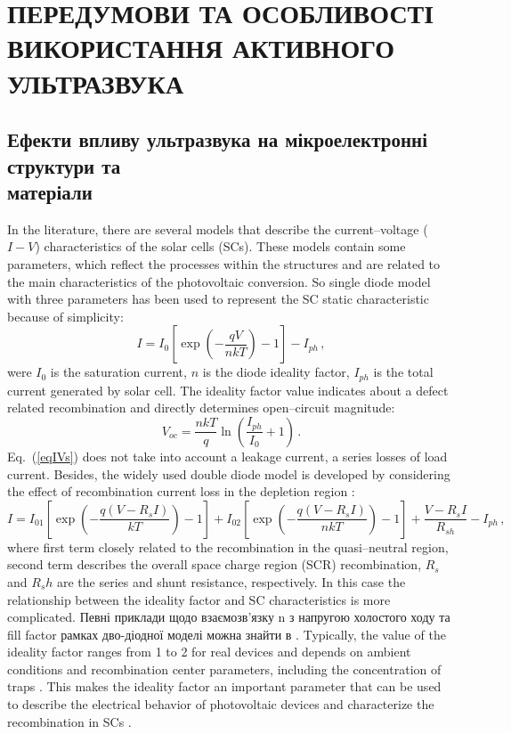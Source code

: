 \chapter{\MakeUppercase{Передумови та особливості використання активного ультразвука}}



\section{Ефекти впливу ультразвука на мікроелектронні структури та \\ матеріали \label{Oglyad}}
In the literature, there are several models that describe the current--voltage ($I-V$) characteristics of the solar cells (SCs).
These models contain some parameters, which reflect the processes within the structures and are related to the main characteristics of the photovoltaic conversion.
So single diode model with three parameters has been used to represent the SC static characteristic because of simplicity:
\begin{equation}
\label{eqIVs}
    I=I_{0}\left[\exp\left(-\frac{qV}{nkT}\right)-1\right]-I_{ph}\,,
\end{equation}
were
$I_0$ is the saturation current,
$n$ is the diode ideality factor,
$I_{ph}$ is the total current generated by solar cell.
The ideality factor value indicates about a defect related recombination and directly determines open--circuit magnitude:
\begin{equation}
\label{eqVoc}
    V_{oc}=\frac{nkT}{q}\ln\left(\frac{I_{ph}}{I_0}+1\right)\,.
\end{equation}
Eq.~(\ref{eqIVs}) does not take into account a leakage current, a series losses of load current.
Besides, the widely used double diode model is developed by considering the effect of recombination current loss
in the depletion region \cite{2Diod:Ishaque,2Diod:Buhler,Breitenstein2013}:
\begin{equation}
\label{eqIVd}
    I=I_{01}\left[\exp\left(-\frac{q(V-R_sI)}{kT}\right)-1\right]
      + I_{02}\left[\exp\left(-\frac{q(V-R_sI)}{nkT}\right)-1\right]
      +\frac{V-R_sI}{R_{sh}}
      -I_{ph}\,,
\end{equation}
where
first term closely related to the recombination in the quasi--neutral region,
second term describes the overall space charge region (SCR) recombination,
$R_s$ and $R_sh$ are the series and shunt resistance, respectively.
In this case the relationship between the ideality factor and SC characteristics is more complicated.
Певні приклади щодо взаємозв'язку n з напругою холостого ходу та fill factor  рамках дво-діодної моделі можна знайти в \cite{Olikh2018SM}.
Typically, the value of the ideality factor ranges from 1 to 2 for real devices and depends on ambient conditions and recombination center parameters,
including the concentration of traps \cite{n2_Beier,n2McIntosh,n2Kaminski,HAMEIRI2013251,Heide}.
This makes the ideality factor an important parameter that can be used to describe the electrical behavior of photovoltaic devices and characterize the recombination in SCs \cite{Duan}.

